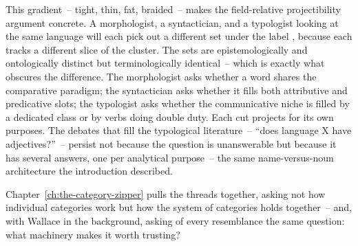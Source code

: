 This gradient~-- tight, thin, fat, braided~-- makes the field-relative projectibility argument concrete. A morphologist, a syntactician, and a typologist looking at the same language will each pick out a different set under the label , because each tracks a different slice of the cluster. The sets are epistemologically and ontologically distinct but terminologically identical~-- which is exactly what obscures the difference. The morphologist asks whether a word shares the comparative paradigm; the syntactician asks whether it fills both attributive and predicative slots; the typologist asks whether the communicative niche is filled by a dedicated class or by verbs doing double duty. Each cut projects for its own purposes. The debates that fill the typological literature~-- \enquote{does language X have adjectives?}~-- persist not because the question is unanswerable but because it has several answers, one per analytical purpose~-- the same name-versus-noun architecture the introduction described.

Chapter~\ref{ch:the-category-zipper} pulls the threads together, asking not how individual categories work but how the system of categories holds together~-- and, with Wallace in the background, asking of every resemblance the same question: what machinery makes it worth trusting?
